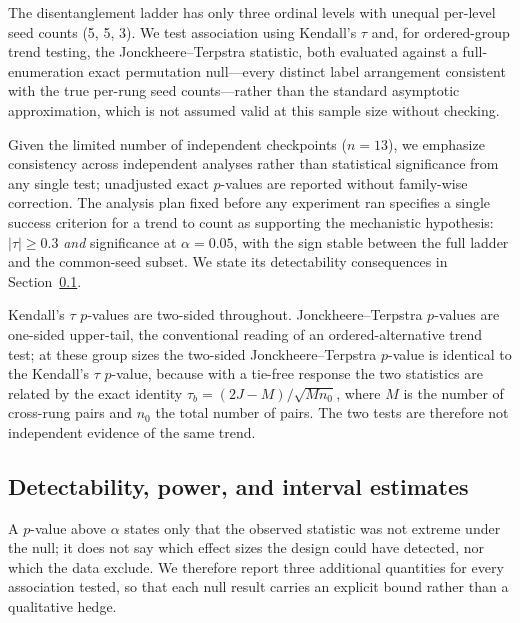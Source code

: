 The disentanglement ladder has only three ordinal levels with unequal per-level seed counts (5, 5, 3). We test association using Kendall's $\tau$ and, for ordered-group trend testing, the Jonckheere--Terpstra statistic, both evaluated against a full-enumeration exact permutation null---every distinct label arrangement consistent with the true per-rung seed counts---rather than the standard asymptotic approximation, which is not assumed valid at this sample size without checking.

Given the limited number of independent checkpoints ($n=13$), we emphasize consistency across independent analyses rather than statistical significance from any single test; unadjusted exact $p$-values are reported without family-wise correction. The analysis plan fixed before any experiment ran specifies a single success criterion for a trend to count as supporting the mechanistic hypothesis: $|\tau|\geq0.3$ \emph{and} significance at $\alpha=0.05$, with the sign stable between the full ladder and the common-seed subset. We state its detectability consequences in Section~\ref{sec:power}.

Kendall's $\tau$ $p$-values are two-sided throughout. Jonckheere--Terpstra $p$-values are one-sided upper-tail, the conventional reading of an ordered-alternative trend test; at these group sizes the two-sided Jonckheere--Terpstra $p$-value is identical to the Kendall's $\tau$ $p$-value, because with a tie-free response the two statistics are related by the exact identity $\tau_b=(2J-M)/\sqrt{M n_0}$, where $M$ is the number of cross-rung pairs and $n_0$ the total number of pairs. The two tests are therefore not independent evidence of the same trend.

\subsection{Detectability, power, and interval estimates}
\label{sec:power}

A $p$-value above $\alpha$ states only that the observed statistic was not extreme under the null; it does not say which effect sizes the design could have detected, nor which the data exclude. We therefore report three additional quantities for every association tested, so that each null result carries an explicit bound rather than a qualitative hedge.

